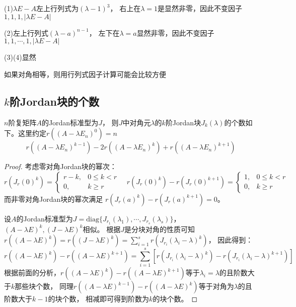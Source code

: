 \begin{solution}
  (1)$\lambda E - A$左上行列式为$(\lambda - 1)^3$，
  右上在$\lambda = 1$是显然非零，因此不变因子$1,1,1,|\lambda E - A|$

  (2)左上行列式$(\lambda - a)^{n-1}$，
  左下在$\lambda = a$显然非零，因此不变因子$1,1,\cdots,1,|\lambda E - A|$

  (3)(4)显然
\end{solution}

\begin{note}
  如果对角相等，则用行列式因子计算可能会比较方便
\end{note}

\subsection{$k$阶Jordan块的个数}

\begin{theorem}[$k$阶Jordan块个数]
  $n$阶复矩阵$A$的Jordan标准型为$J$，
  则$J$中对角元$\lambda$的$k$阶Jordan块$J_k(\lambda)$的个数如下。这里约定$r((A - \lambda E_n)^0) = n$
  \begin{equation*}
    r((A - \lambda E_n)^{k-1}) - 2r((A - \lambda E_n)^k) + r((A - \lambda E_n)^{k+1})
  \end{equation*}
\end{theorem}

\begin{proof}
  考虑零对角Jordan块的幂次：
  \begin{equation*}
    r(J_r(0)^k) =
    \begin{cases}
      r - k, & 0 \leq k < r\\
      0, & k \geq r
    \end{cases} \quad
    r(J_r(0)^k) - r(J_r(0)^{k+1}) =
    \begin{cases}
      1, & 0 \leq k < r\\
      0, & k \geq r
    \end{cases}
  \end{equation*}
  而非零对角Jordan块的幂次满足
  $r(J_r(a)^k) - r(J_r(a)^{k+1}) = 0$。
  
  设$A$的Jordan标准型为$J = \text{diag}\{J_{r_1}(\lambda_1),\cdots,J_{r_s}(\lambda_s)\}$，
  $(A - \lambda E)^k, (J - \lambda E)^k$相似。
  根据$J$是分块对角的性质可知$r((A - \lambda E)^k) = r((J - \lambda E)^k) = \sum\limits_{i = 1}^s r(J_{r_i}(\lambda_i - \lambda)^k)$，
  因此得到：
  \begin{equation*}
     r((A - \lambda E)^k) - r((A - \lambda E)^{k+1}) = \sum\limits_{i = 1}^s [r(J_{r_i}(\lambda_i - \lambda)^k) - r(J_{r_i}(\lambda_i - \lambda)^{k+1})]
  \end{equation*}
  根据前面的分析，$r((A - \lambda E)^k) - r((A - \lambda E)^{k+1})$等于$\lambda_i = \lambda$的且阶数大于$k$那些块个数，
  同理$r((A - \lambda E)^{k-1}) - r((A - \lambda E)^k)$等于对角为$\lambda$的且阶数大于$k - 1$的块个数，
  相减即可得到阶数为$k$的块个数。
\end{proof}

